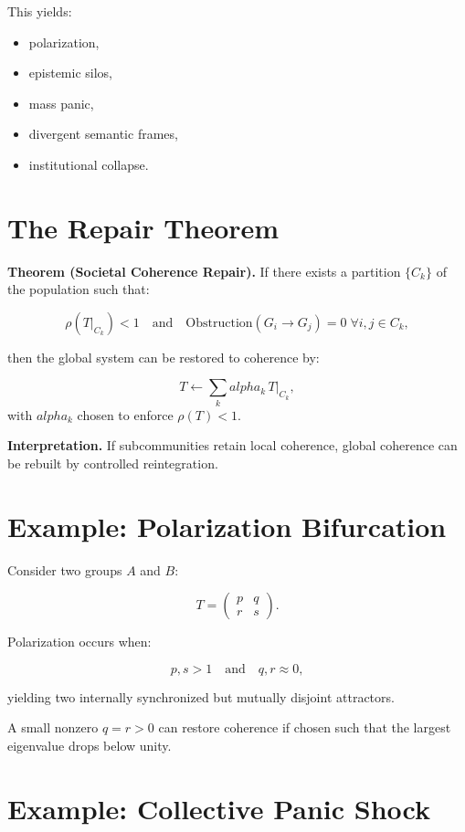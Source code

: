 \documentclass[12pt,oneside]{book}
\theoremstyle{plain}
\theoremstyle{definition}
\def\alpha{alpha}%
\begin{document}
This yields:

\begin{itemize}
  \item polarization,
  \item epistemic silos,
  \item mass panic,
  \item divergent semantic frames,
  \item institutional collapse.
\end{itemize}

\section{The Repair Theorem}

\textbf{Theorem (Societal Coherence Repair).}
If there exists a partition $\{C_k\}$ of the population such that:

\[
\rho(T|_{C_k}) < 1
\quad\text{and}\quad
\mathrm{Obstruction}(G_i \to G_j)=0\; \forall i,j\in C_k,
\]

then the global system can be restored to coherence by:

\[
T \leftarrow \sum_k \alpha_k \, T|_{C_k},
\]
with $\alpha_k$ chosen to enforce $ \rho(T) < 1$.

\smallskip

\noindent\textbf{Interpretation.}
If subcommunities retain local coherence, global coherence can be rebuilt by controlled reintegration.

\section{Example: Polarization Bifurcation}

Consider two groups $A$ and $B$:

\[
T =
\begin{pmatrix}
p & q \\
r & s
\end{pmatrix}.
\]

Polarization occurs when:

\[
p,s > 1 \quad\text{and}\quad q,r \approx 0,
\]

yielding two internally synchronized but mutually disjoint attractors.

A small nonzero $q=r>0$ can restore coherence
if chosen such that the largest eigenvalue drops below unity.

\section{Example: Collective Panic Shock}
\end{document}
